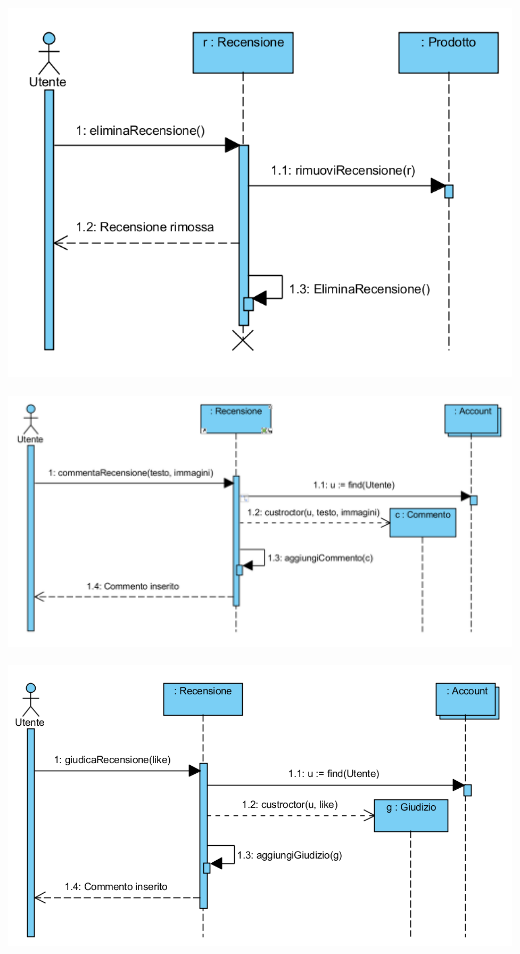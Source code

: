 \begin{center}
			\includegraphics[width=\textwidth]{assets/visualParadigm/sequenza/rimuoviRecensione}
\end{center}

\begin{center}
			\includegraphics[width=\textwidth]{assets/visualParadigm/sequenza/commentoRecensione}
\end{center}

\begin{center}
			\includegraphics[width=\textwidth]{assets/visualParadigm/sequenza/giudicaRecensione}
\end{center}

